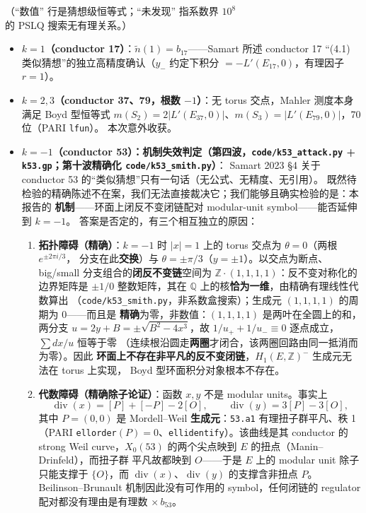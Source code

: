 \documentclass[11pt,a4paper]{ctexart}
\theoremstyle{remark}
\newcommand{\diver}{\mathop{\mathrm{div}}}
\newcommand{\QQ}{\mathbb{Q}}
\newcommand{\ZZ}{\mathbb{Z}}
\begin{document}
（``数值'' 行是猜想级恒等式；``未发现'' 指系数界 $10^8$ 的 PSLQ 搜索无有理关系。）

\begin{itemize}[nosep]
\item \textbf{$k=1$（conductor 17）}：$\tilde n(1)=b_{17}$——Samart 所述 conductor 17
“(4.1) 类似猜想”的独立高精度确认（$y_-$ 约定下积分 $=-L'(E_{17},0)$，有理因子 $r=1$）。
\item \textbf{$k=2,3$（conductor 37、79，根数 $-1$）}：无 torus 交点，Mahler 测度本身满足
Boyd 型恒等式 $m(S_2)=2|L'(E_{37},0)|$、$m(S_3)=|L'(E_{79},0)|$，70 位（PARI \texttt{lfun}）。
本次意外收获。
\item \textbf{$k=-1$（conductor 53）：机制失效判定（第四波，\texttt{code/k53\_attack.py} + \texttt{k53.gp}；第十波精确化 \texttt{code/k53\_smith.py}）}：
Samart 2023 \S4 关于 conductor 53 的``类似猜想''只有一句话（无公式、无精度、无引用）。
既然待检验的精确陈述不在案，我们无法直接裁决它；我们能够且确实检验的是：本报告的
\textbf{机制}——环面上闭反不变闭链配对 modular-unit symbol——能否延伸到 $k=-1$。
答案是否定的，有三个相互独立的原因：
\begin{enumerate}[nosep]
\item \textbf{拓扑障碍（精确）}：$k=-1$ 时 $|x|=1$ 上的 torus 交点为 $\theta=0$（两根 $e^{\pm2\pi i/3}$，
分支在此\textbf{交换}）与 $\theta=\pm\pi/3$（$y=\pm1$）。以交点为断点、big/small
分支组合的\textbf{闭反不变链}空间为 $\ZZ\cdot(1,1,1,1)$：反不变对称化的边界矩阵是
$\pm1/0$ 整数矩阵，其在 $\QQ$ 上的核\textbf{恰为一维}，由精确有理线性代数算出
（\texttt{code/k53\_smith.py}，非系数盒搜索）；生成元 $(1,1,1,1)$ 的周期为 $0$——而且是
\textbf{精确}为零，非数值：$(1,1,1,1)$ 是两叶在全圆上的和，两分支
$u=2y+B=\pm\sqrt{B^2-4x^3}$，故 $1/u_++1/u_-\equiv0$ 逐点成立，$\sum dx/u$ 恒等于零
（连续根沿圆走\textbf{两圈}才闭合，该两圈回路由同一抵消而为零）。因此
\textbf{环面上不存在非平凡的反不变闭链}，$H_1(E,\ZZ)^-$ 生成元无法在 torus 上实现，
Boyd 型环面积分对象根本不存在。
\item \textbf{代数障碍（精确除子论证）}：函数 $x,y$ 不是 modular units。事实上
\[
\diver(x)=[P]+[-P]-2[O],\qquad \diver(y)=3[P]-3[O],
\]
其中 $P=(0,0)$ 是 Mordell--Weil \textbf{生成元}：\texttt{53.a1} 有理扭子群平凡、秩 1
（PARI \texttt{ellorder}$(P)=0$、\texttt{ellidentify}）。该曲线是其 conductor 的
strong Weil curve，$X_0(53)$ 的两个尖点映到 $E$ 的扭点（Manin--Drinfeld），而扭子群
平凡故都映到 $O$——于是 $E$ 上的 modular unit 除子只能支撑于 $\{O\}$，而
$\diver(x)$、$\diver(y)$ 的支撑含非扭点 $P$。Beilinson--Brunault 机制因此没有可作用的
symbol，任何闭链的 regulator 配对都没有理由是有理数 $\times\,b_{53}$。

\end{enumerate}
\end{itemize}
\end{document}
